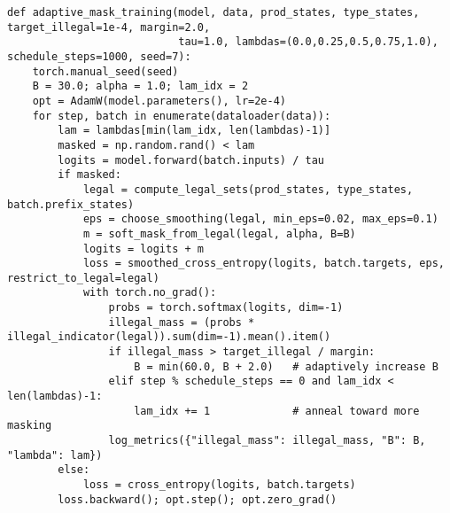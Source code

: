 \documentclass{article}
\begin{document}
\begin{lstlisting}[style=py, caption={Adaptive masked training with leakage target and mixture for calibration.}]
def adaptive_mask_training(model, data, prod_states, type_states, target_illegal=1e-4, margin=2.0, 
                           tau=1.0, lambdas=(0.0,0.25,0.5,0.75,1.0), schedule_steps=1000, seed=7):
    torch.manual_seed(seed)
    B = 30.0; alpha = 1.0; lam_idx = 2
    opt = AdamW(model.parameters(), lr=2e-4)
    for step, batch in enumerate(dataloader(data)):
        lam = lambdas[min(lam_idx, len(lambdas)-1)]
        masked = np.random.rand() < lam
        logits = model.forward(batch.inputs) / tau
        if masked:
            legal = compute_legal_sets(prod_states, type_states, batch.prefix_states)
            eps = choose_smoothing(legal, min_eps=0.02, max_eps=0.1)
            m = soft_mask_from_legal(legal, alpha, B=B)
            logits = logits + m
            loss = smoothed_cross_entropy(logits, batch.targets, eps, restrict_to_legal=legal)
            with torch.no_grad():
                probs = torch.softmax(logits, dim=-1)
                illegal_mass = (probs * illegal_indicator(legal)).sum(dim=-1).mean().item()
                if illegal_mass > target_illegal / margin:
                    B = min(60.0, B + 2.0)   # adaptively increase B
                elif step % schedule_steps == 0 and lam_idx < len(lambdas)-1:
                    lam_idx += 1             # anneal toward more masking
                log_metrics({"illegal_mass": illegal_mass, "B": B, "lambda": lam})
        else:
            loss = cross_entropy(logits, batch.targets)
        loss.backward(); opt.step(); opt.zero_grad()
\end{lstlisting}
\end{document}
